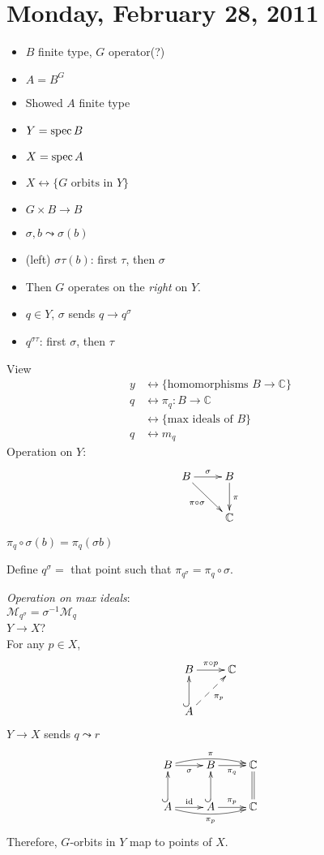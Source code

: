 \documentclass [letterpaper,11pt,twoside]{article}
\begin{document}
\setcounter {section}{10}\section {Monday, February 28, 2011}
  \begin{itemize}
    \item[] $B$ finite type, $G$ operator(?)
    \item[] $A = B^G$
    \item[] Showed $A$ finite type
    \item[] $Y = \operatorname{spec} B$
    \item[] $X = \operatorname{spec} A$
    \item[] $X \leftrightarrow \{G\text{ orbits in }Y\}$
    \item[] $G \times B \to B$
    \item[] $\sigma, b \leadsto \sigma(b)$
    \item[] (left) $\sigma \tau(b)$: first $\tau$, then $\sigma$
    \item[] Then $G$ operates on the \emph{right} on $Y$.
    \item[] $q\in Y$, $\sigma$ sends $q\to q^\sigma$
    \item[] $q^{\sigma\tau}$: first $\sigma$, then $\tau$
  \end{itemize}
  View
  \begin{align*}
    y & \leftrightarrow \{\text{homomorphisms }B \to \mathbb C\} \\
    q & \leftrightarrow \pi_q: B \to \mathbb C \\
    & \leftrightarrow \{\text{max ideals of }B\} \\
    q & \leftrightarrow m_q
  \end{align*}
  Operation on $Y$:
  $$
  \xymatrix{
    B \ar[r]^\sigma \ar[dr]_{\pi \circ \sigma} & B \ar[d]^\pi \\
                                               & \mathbb C
  }
  $$

  $\pi_q \circ \sigma(b) = \pi_q(\sigma b)$

  Define $q^\sigma = $ that point such that $\pi_{q^\sigma} = \pi_q \circ \sigma$.

  \noindent \emph{Operation on max ideals}: \\
  $\mathcal M_{q^\sigma} = \sigma^{-1}\mathcal M_q$ \\
  $Y \to X$? \\
  For any $p\in X$,
  $$
  \xymatrix{
    B \ar[r]^{\pi \circ p} & \mathbb C \\ %
    A \ar@{-->}[ur]_{\pi_p}  \ar@{^{(}->}[u]
  }
  $$
  $Y \to X$ sends $q  \leadsto r$ \\
  $$
  \xymatrix{
    B \ar[r]_{\sigma} \ar@/^/[rr]^{\pi} & B \ar[r]_{\pi_q} & \mathbb C \ar@{=}[d] \\
    A \ar@{^{(}->}[u] \ar[r]^{\text{id}} \ar@/_/[rr]_{\pi_p} & A  \ar@{^{(}->}[u] \ar[r]^{\pi_p} & \mathbb C
  }
  $$
  Therefore, $G$-orbits in $Y$ map to points of $X$.
\end{document}

